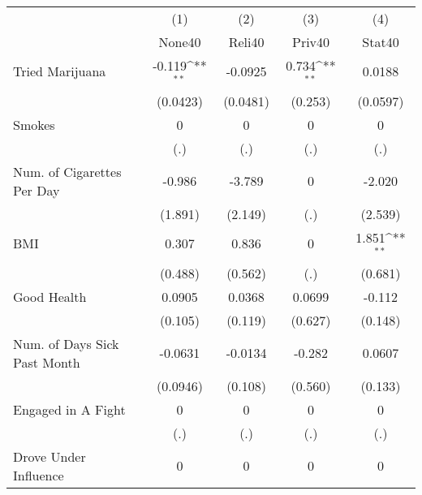 {
\def\sym#1{\ifmmode^{#1}\else\(^{#1}\)\fi}
\begin{tabular}{l*{4}{c}}
\hline\hline
            &\multicolumn{1}{c}{(1)}&\multicolumn{1}{c}{(2)}&\multicolumn{1}{c}{(3)}&\multicolumn{1}{c}{(4)}\\
            &\multicolumn{1}{c}{None40}&\multicolumn{1}{c}{Reli40}&\multicolumn{1}{c}{Priv40}&\multicolumn{1}{c}{Stat40}\\
\hline
Tried Marijuana&      -0.119\sym{**} &     -0.0925         &       0.734\sym{**} &      0.0188         \\
            &    (0.0423)         &    (0.0481)         &     (0.253)         &    (0.0597)         \\
[1em]
Smokes      &           0         &           0         &           0         &           0         \\
            &         (.)         &         (.)         &         (.)         &         (.)         \\
[1em]
Num. of Cigarettes Per Day&      -0.986         &      -3.789         &           0         &      -2.020         \\
            &     (1.891)         &     (2.149)         &         (.)         &     (2.539)         \\
[1em]
BMI         &       0.307         &       0.836         &           0         &       1.851\sym{**} \\
            &     (0.488)         &     (0.562)         &         (.)         &     (0.681)         \\
[1em]
Good Health &      0.0905         &      0.0368         &      0.0699         &      -0.112         \\
            &     (0.105)         &     (0.119)         &     (0.627)         &     (0.148)         \\
[1em]
Num. of Days Sick Past Month&     -0.0631         &     -0.0134         &      -0.282         &      0.0607         \\
            &    (0.0946)         &     (0.108)         &     (0.560)         &     (0.133)         \\
[1em]
Engaged in A Fight&           0         &           0         &           0         &           0         \\
            &         (.)         &         (.)         &         (.)         &         (.)         \\
[1em]
Drove Under Influence&           0         &           0         &           0         &           0         \\

\end{tabular}}
